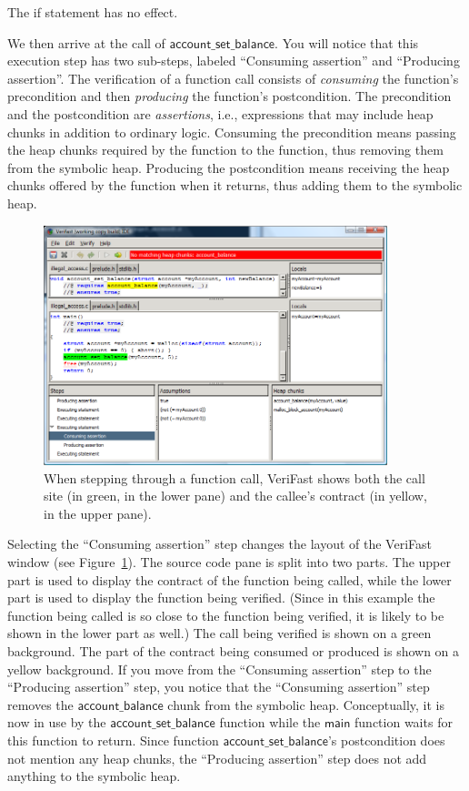 \documentclass{article}
\begin{document}
The if statement has no effect.

We then arrive at the call of $\mathsf{account\_set\_balance}$.
You will notice that this execution step has two sub-steps,
labeled ``Consuming assertion'' and ``Producing assertion''.
The verification of a function call consists of
\emph{consuming} the function's precondition and then
\emph{producing} the function's postcondition. The precondition
and the postcondition are \emph{assertions}, i.e., expressions
that may include heap chunks in addition to ordinary logic.
Consuming the precondition means passing the heap chunks
required by the function to the function, thus removing them
from the symbolic heap. Producing the postcondition means
receiving the heap chunks offered by the function when it
returns, thus adding them to the symbolic heap.

\begin{figure}
\begin{center}
\includegraphics[width=10cm]{illegal_access3.png}
\end{center}
\caption{When stepping through a function call, VeriFast shows both the call site (in green, in the lower pane) and the callee's contract (in yellow, in the upper pane).}\label{figure:call}
\end{figure}

Selecting the ``Consuming assertion'' step changes the layout
of the VeriFast window (see Figure~\ref{figure:call}).
The source code pane is split into two
parts. The upper part is used to display the contract of the
function being called, while the lower part is used to display
the function being verified. (Since in this example the
function being called is so close to the function being
verified, it is likely to be shown in the lower part as well.)
The call being verified is shown on a green background. The
part of the contract being consumed or produced is shown on a
yellow background. If you move from the ``Consuming assertion''
step to the ``Producing assertion'' step, you notice that the
``Consuming assertion'' step removes the
$\mathsf{account\_balance}$ chunk from the symbolic heap.
Conceptually, it is now in use by the
$\mathsf{account\_set\_balance}$ function while the
$\mathsf{main}$ function waits for this function to return.
Since function $\mathsf{account\_set\_balance}$'s postcondition
does not mention any heap chunks, the ``Producing assertion''
step does not add anything to the symbolic heap.
\end{document}
